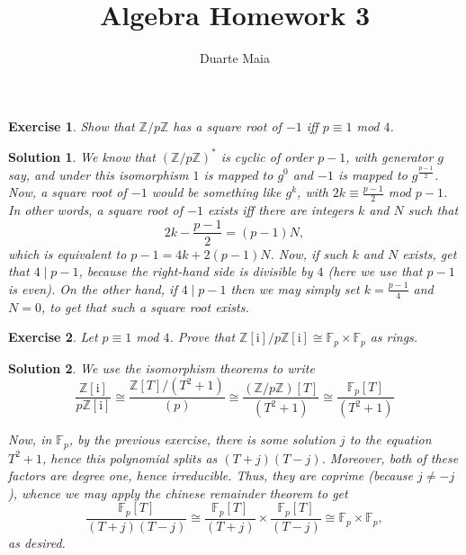 \documentclass{article}
\title{Algebra Homework 3}
\author{Duarte Maia}
\newtheorem{ex}{Exercise}
\theoremstyle{nonumberplain}
\newtheorem{sol}{Solution}
\newcommand{\Z}{\mathbb{Z}}
\newcommand{\FF}{\mathbb{F}}
\newcommand{\I}{\mathrm{i}}
\begin{document}
\maketitle

\setcounter{ex}{14}

\begin{ex}
Show that $\Z/p\Z$ has a square root of $-1$ iff $p \equiv 1$ mod $4$.
\end{ex}

\begin{sol}
We know that $(\Z/p\Z)^*$ is cyclic of order $p-1$, with generator $g$ say, and under this isomorphism $1$ is mapped to $g^0$ and $-1$ is mapped to $g^{\frac{p-1}2}$. Now, a square root of $-1$ would be something like $g^k$, with $2k \equiv \frac{p-1}2$ mod $p-1$. In other words, a square root of $-1$ exists iff there are integers $k$ and $N$ such that
\begin{equation}
2k - \frac{p-1}2 = (p-1)N,
\end{equation}
which is equivalent to $p-1 = 4k + 2 (p-1) N$. Now, if such $k$ and $N$ exists, get that $4 \mid p-1$, because the right-hand side is divisible by $4$ (here we use that $p-1$ is even). On the other hand, if $4 \mid p-1$ then we may simply set $k = \frac{p-1}4$ and $N = 0$, to get that such a square root exists.
\end{sol}

\begin{ex}
Let $p \equiv 1$ mod $4$. Prove that $\Z[\I] / p \Z[\I] \cong \FF_p \times \FF_p$ as rings.
\end{ex}

\begin{sol}
We use the isomorphism theorems to write
\begin{equation}
\frac{\Z[\I]}{p \Z[\I]} \cong \frac{\Z[T]/(T^2 + 1)}{(p)} \cong \frac{(\Z/p\Z)[T]}{(T^2 + 1)} \cong \frac{\FF_p[T]}{(T^2 + 1)}
\end{equation}

Now, in $\FF_p$, by the previous exercise, there is some solution $j$ to the equation $T^2 + 1$, hence this polynomial splits as $(T+j)(T-j)$. Moreover, both of these factors are degree one, hence irreducible. Thus, they are coprime (because $j \neq -j$), whence we may apply the chinese remainder theorem to get
\begin{equation}
\frac{\FF_p[T]}{(T+j)(T-j)} \cong \frac{\FF_p[T]}{(T+j)} \times \frac{\FF_p[T]}{(T-j)} \cong \FF_p \times \FF_p,
\end{equation}
as desired.
\end{sol}
\end{document}
